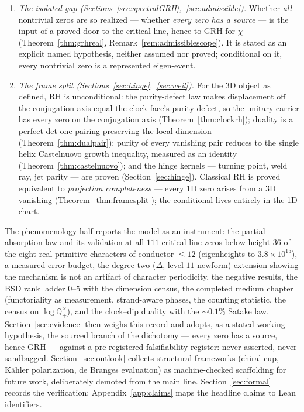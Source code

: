 \documentclass[11pt]{article}
\begin{document}
\begin{enumerate}[label=\textup{(\arabic*)}]
\item \emph{The isolated gap (Sections~\ref{sec:spectralGRH},~\ref{sec:admissible}).}
Whether \emph{all} nontrivial zeros are so realized --- whether \emph{every zero has a source} ---
is the input of a proved door to the critical line, hence to GRH for $\chi$
(Theorem~\ref{thm:grhreal}, Remark~\ref{rem:admissiblescope}).  It is stated as an explicit named
hypothesis, neither assumed nor proved; conditional on it, every nontrivial zero is a represented
eigen-event.

\item \emph{The frame split (Sections~\ref{sec:hinge},~\ref{sec:weil}).}  For the 3D object as
defined, RH is unconditional: the purity-defect law makes displacement off the conjugation axis
equal the clock face's purity defect, so the unitary carrier has every zero on the conjugation
axis (Theorem~\ref{thm:clockrh}); duality is a perfect det-one pairing preserving the local dimension
(Theorem~\ref{thm:dualpair}); purity of every vanishing pair reduces to the single helix
Castelnuovo growth inequality, measured as an identity (Theorem~\ref{thm:castelnuovo}); and the
hinge kernels --- turning point, weld ray, jet parity --- are proven (Section~\ref{sec:hinge}).
Classical RH is proved equivalent to \emph{projection completeness} --- every 1D zero arises from
a 3D vanishing (Theorem~\ref{thm:framesplit}); the conditional lives entirely in the 1D chart.
\end{enumerate}

The phenomenology half reports the model as an instrument: the partial-absorption law and its validation at all
$111$ critical-line zeros below height $36$ of the eight real primitive characters of conductor
$\le12$ (eigenheights to $3.8\times10^{15}$), a measured error budget, the degree-two ($\Delta$,
level-$11$ newform) extension showing the mechanism is not an artifact of character periodicity, the
negative results, the BSD rank ladder $0$--$5$ with the dimension census, the completed medium
chapter (functoriality as measurement, strand-aware phases, the counting statistic, the census on
$\log\mathbb{Q}_+^{\times}$), and the clock--dip duality with the ${\sim}0.1\%$ Satake law.
Section~\ref{sec:evidence} then weighs this record and adopts, as a stated
working hypothesis, the sourced branch of the dichotomy --- every zero has a source, hence GRH ---
against a pre-registered falsifiability register: never asserted, never sandbagged.
Section~\ref{sec:outlook} collects structural frameworks (chiral cup, K\"ahler
polarization, de Branges evaluation) as machine-checked scaffolding for future work, deliberately
demoted from the main line.  Section~\ref{sec:formal} records the verification;
Appendix~\ref{app:claims} maps the headline claims to Lean identifiers.
\end{document}
